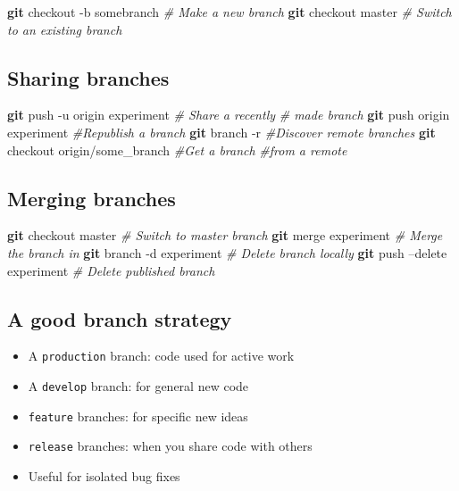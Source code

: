 \documentclass[]{scrartcl}
\newenvironment{Shaded}{}{}
\newcommand{\KeywordTok}[1]{\textcolor[rgb]{0.00,0.44,0.13}{\textbf{{#1}}}}
\newcommand{\CommentTok}[1]{\textcolor[rgb]{0.38,0.63,0.69}{\textit{{#1}}}}
\newcommand{\NormalTok}[1]{{#1}}
\begin{document}
\begin{Shaded}
\begin{Highlighting}[]
\KeywordTok{git} \NormalTok{checkout -b somebranch }\CommentTok{# Make a new branch}
\KeywordTok{git} \NormalTok{checkout master }\CommentTok{# Switch to an existing branch}
\end{Highlighting}
\end{Shaded}

\subsection{Sharing branches}\label{sharing-branches}

\begin{Shaded}
\begin{Highlighting}[]
\KeywordTok{git} \NormalTok{push -u origin experiment }\CommentTok{# Share a recently}
                              \CommentTok{# made branch}
\KeywordTok{git} \NormalTok{push origin experiment }\CommentTok{#Republish a branch}
\KeywordTok{git} \NormalTok{branch -r }\CommentTok{#Discover remote branches}
\KeywordTok{git} \NormalTok{checkout origin/some_branch }\CommentTok{#Get a branch}
                                \CommentTok{#from a remote}
\end{Highlighting}
\end{Shaded}

\subsection{Merging branches}\label{merging-branches}

\begin{Shaded}
\begin{Highlighting}[]
\KeywordTok{git} \NormalTok{checkout master }\CommentTok{# Switch to master branch}
\KeywordTok{git} \NormalTok{merge experiment }\CommentTok{# Merge the branch in}
\KeywordTok{git} \NormalTok{branch -d experiment }\CommentTok{# Delete branch locally}
\KeywordTok{git} \NormalTok{push --delete experiment }\CommentTok{# Delete published branch}
\end{Highlighting}
\end{Shaded}

\subsection{A good branch strategy}\label{a-good-branch-strategy}

\begin{itemize}
\itemsep1pt\parskip0pt
\item
  A \texttt{production} branch: code used for active work
\item
  A \texttt{develop} branch: for general new code
\item
  \texttt{feature} branches: for specific new ideas
\item
  \texttt{release} branches: when you share code with others
\item
  Useful for isolated bug fixes
\end{itemize}
\end{document}

